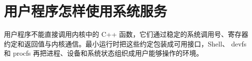 \chapter{用户程序怎样使用系统服务}

用户程序不能直接调用内核中的 C++ 函数，它们通过稳定的系统调用号、寄存器
约定和返回值与内核通信。最小运行时把这些约定包装成可用接口，Shell、
devfs 和 procfs 再把进程、设备和系统状态组织成用户能够操作的环境。






